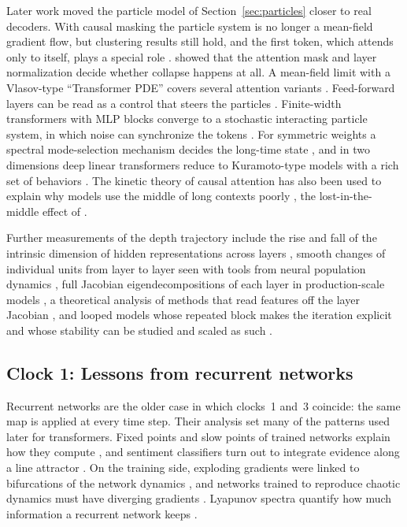 Later work moved the particle model of Section~\ref{sec:particles} closer to real decoders. With causal masking the particle system is no longer a mean-field gradient flow, but clustering results still hold, and the first token, which attends only to itself, plays a special role \citep{karagodin2024clustering}. \citet{wu2024role} showed that the attention mask and layer normalization decide whether collapse happens at all. A mean-field limit with a Vlasov-type ``Transformer PDE'' covers several attention variants \citep{castin2025unified}. Feed-forward layers can be read as a control that steers the particles \citep{maranzatto2026role}. Finite-width transformers with MLP blocks converge to a stochastic interacting particle system, in which noise can synchronize the tokens \citep{agazzi2026stochastic}. For symmetric weights a spectral mode-selection mechanism decides the long-time state \citep{kuehn2026spectral}, and in two dimensions deep linear transformers reduce to Kuramoto-type models with a rich set of behaviors \citep{li2026diverse}. The kinetic theory of causal attention has also been used to explain why models use the middle of long contexts poorly \citep{duerinckx2026kinetic}, the lost-in-the-middle effect of \citet{liu2023lost}.

Further measurements of the depth trajectory include the rise and fall of the intrinsic dimension of hidden representations across layers \citep{valeriani2023geometry}, smooth changes of individual units from layer to layer seen with tools from neural population dynamics \citep{fernando2025transformer}, full Jacobian eigendecompositions of each layer in production-scale models \citep{fernando2026dynamics}, a theoretical analysis of methods that read features off the layer Jacobian \citep{ostrow2026mathematical}, and looped models whose repeated block makes the iteration explicit and whose stability can be studied and scaled as such \citep{prairie2026parcae}.

\subsection{Clock 1: Lessons from recurrent networks}

Recurrent networks are the older case in which clocks~1 and~3 coincide: the same map is applied at every time step. Their analysis set many of the patterns used later for transformers. Fixed points and slow points of trained networks explain how they compute \citep{sussillo2013opening}, and sentiment classifiers turn out to integrate evidence along a line attractor \citep{maheswaranathan2019reverse}. On the training side, exploding gradients were linked to bifurcations of the network dynamics \citep{pascanu2012difficulty,ribeiro2019exploding}, and networks trained to reproduce chaotic dynamics must have diverging gradients \citep{mikhaeil2021difficulty}. Lyapunov spectra quantify how much information a recurrent network keeps \citep{engelken2020lyapunov,vogt2020lyapunov}.

